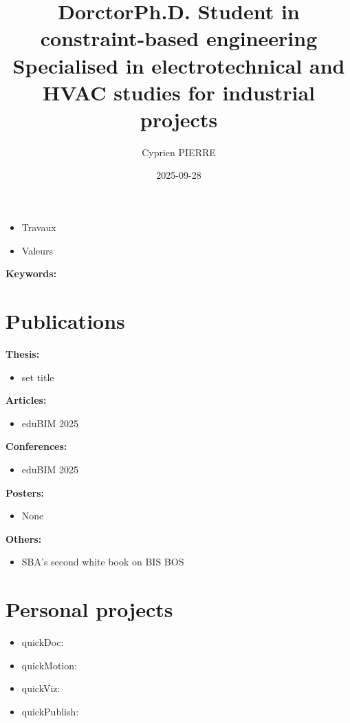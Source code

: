\documentclass[a4paper,12pt]{article}
\author{Cyprien PIERRE}
\date{2025-09-28}
\title{DorctorPh.D. Student in constraint-based engineering\\\medskip
\large Specialised in electrotechnical and HVAC studies for industrial projects}
\begin{document}
\maketitle
\begin{ABSTRACT}
\begin{itemize}
\item Travaux
\item Valeurs
\end{itemize}
\end{ABSTRACT}


\textbf{Keywords: }
\section{Publications}
\label{sec:org8725526}
\textbf{Thesis:}
\begin{itemize}
\item set title
\end{itemize}
\textbf{Articles:}
\begin{itemize}
\item eduBIM 2025
\end{itemize}
\textbf{Conferences:}
\begin{itemize}
\item eduBIM 2025
\end{itemize}
\textbf{Posters:}
\begin{itemize}
\item None
\end{itemize}
\textbf{Others:}
\begin{itemize}
\item SBA's second white book on BIS BOS
\end{itemize}
\section{Personal projects}
\label{sec:org0837de2}
\begin{itemize}
\item quickDoc:
\item quickMotion:
\item quickViz:
\item quickPublish:
\end{itemize}
\end{document}
